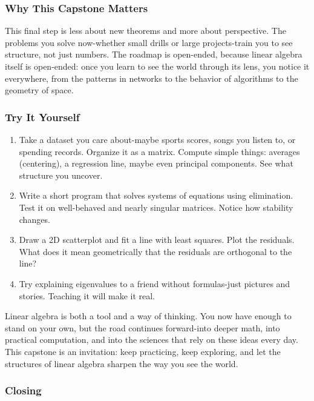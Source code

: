 \documentclass[
  letterpaper,
  DIV=11,
  numbers=noendperiod]{scrreprt}
\providecommand{\tightlist}{%
  \setlength{\itemsep}{0pt}\setlength{\parskip}{0pt}}
\begin{document}
\subsubsection{Why This Capstone
Matters}\label{why-this-capstone-matters}

This final step is less about new theorems and more about perspective.
The problems you solve now-whether small drills or large projects-train
you to see structure, not just numbers. The roadmap is open-ended,
because linear algebra itself is open-ended: once you learn to see the
world through its lens, you notice it everywhere, from the patterns in
networks to the behavior of algorithms to the geometry of space.

\subsubsection{Try It Yourself}\label{try-it-yourself-99}

\begin{enumerate}
\def\labelenumi{\arabic{enumi}.}
\tightlist
\item
  Take a dataset you care about-maybe sports scores, songs you listen
  to, or spending records. Organize it as a matrix. Compute simple
  things: averages (centering), a regression line, maybe even principal
  components. See what structure you uncover.
\item
  Write a short program that solves systems of equations using
  elimination. Test it on well-behaved and nearly singular matrices.
  Notice how stability changes.
\item
  Draw a 2D scatterplot and fit a line with least squares. Plot the
  residuals. What does it mean geometrically that the residuals are
  orthogonal to the line?
\item
  Try explaining eigenvalues to a friend without formulas-just pictures
  and stories. Teaching it will make it real.
\end{enumerate}

Linear algebra is both a tool and a way of thinking. You now have enough
to stand on your own, but the road continues forward-into deeper math,
into practical computation, and into the sciences that rely on these
ideas every day. This capstone is an invitation: keep practicing, keep
exploring, and let the structures of linear algebra sharpen the way you
see the world.

\subsubsection{Closing}\label{closing-9}
\end{document}
